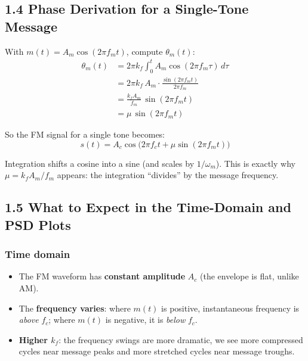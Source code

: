 \documentclass[../../main.tex]{subfiles}
\begin{document}
\vspace{1em}

\subsection{1.4 \; Phase Derivation for a Single-Tone Message}

With $m(t) = A_m \cos(2\pi f_m t)$, compute $\theta_m(t)$:
\begin{align}
  \theta_m(t)
  &= 2\pi k_f \int_0^{t} A_m \cos(2\pi f_m \tau)\,d\tau \nonumber\\[6pt]
  &= 2\pi k_f \, A_m \cdot \frac{\sin(2\pi f_m t)}{2\pi f_m} \nonumber\\[6pt]
  &= \frac{k_f A_m}{f_m}\,\sin(2\pi f_m t) \nonumber\\[6pt]
  &= \mu\,\sin(2\pi f_m t)
\end{align}

So the FM signal for a single tone becomes:
\[
  s(t) = A_c \cos\!\Big(2\pi f_c t + \mu\sin(2\pi f_m t)\Big)
\]

\begin{IntuitionBox}
Integration shifts a cosine into a sine (and scales by $1/\omega_m$). This is exactly why $\mu = k_f A_m / f_m$ appears: the integration ``divides'' by the message frequency.
\end{IntuitionBox}

\vspace{1em}

\subsection{1.5 \; What to Expect in the Time-Domain and PSD Plots}

\subsubsection{Time domain}
\begin{itemize}[leftmargin=1.5em]
  \item The FM waveform has \textbf{constant amplitude} $A_c$ (the envelope is flat, unlike AM).
  \item The \textbf{frequency varies}: where $m(t)$ is positive, instantaneous frequency is \emph{above} $f_c$; where $m(t)$ is negative, it is \emph{below} $f_c$.
  \item \textbf{Higher $k_f$}: the frequency swings are more dramatic, we see more compressed cycles near message peaks and more stretched cycles near message troughs.
\end{itemize}
\end{document}
